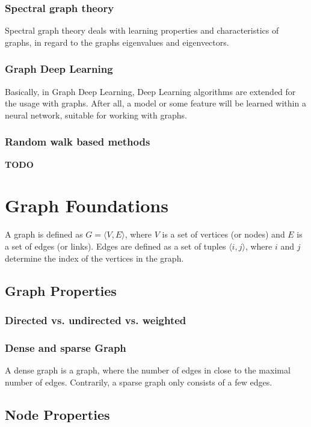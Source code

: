 \subsubsection{Spectral graph theory}
Spectral graph theory \cite{SpectralGraphTheory} deals with learning properties and characteristics of graphs, in regard to
the graphs eigenvalues and eigenvectors. 

\subsubsection{Graph Deep Learning}
Basically, in Graph Deep Learning, Deep Learning algorithms are extended for the usage with graphs.
After all, a model or some feature will be learned within a neural network, suitable for working with graphs.

\subsubsection{Random walk based methods}
\textbf{TODO}


\section{Graph Foundations}
A graph is defined as  $G = \langle V,E \rangle$, where $V$ is a set of 
vertices (or nodes) and $E$ is a set of edges (or links). Edges are 
defined as a set of tuples $\langle i,j \rangle$, where $i$ and $j$ determine the 
index of the vertices in the graph.

\subsection{Graph Properties}

\subsubsection{Directed vs. undirected vs. weighted}

\subsubsection{Dense and sparse Graph}
A dense graph is a graph, where the number of edges in close to the maximal number of edges.
Contrarily, a sparse graph only consists of a few edges.

\subsection{Node Properties}
